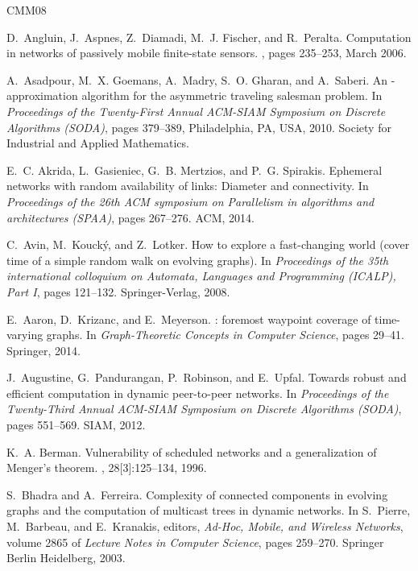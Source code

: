 \documentclass[oribibl, 11pt]{llncs}
\begin{document}
\newcommand{\etalchar}[1]{}
\begin{thebibliography}{CMM{\etalchar{+}}08}

\bibitem[AAD{\etalchar{+}}06]{AADFP06}
D.~Angluin, J.~Aspnes, Z.~Diamadi, M.~J. Fischer, and R.~Peralta.
\newblock Computation in networks of passively mobile finite-state sensors.
, pages 235--253, March 2006.

\bibitem[AGM{\etalchar{+}}10]{AGMGS10}
A.~Asadpour, M.~X. Goemans, A.~Madry, S.~O. Gharan, and A.~Saberi.
\newblock An {}-approximation algorithm for the
  asymmetric traveling salesman problem.
\newblock In {\em Proceedings of the Twenty-First Annual ACM-SIAM Symposium on
  Discrete Algorithms (SODA)}, pages 379--389, Philadelphia, PA, USA, 2010.
  Society for Industrial and Applied Mathematics.

E.~C. Akrida, L.~Gasieniec, G.~B. Mertzios, and P.~G. Spirakis.
\newblock Ephemeral networks with random availability of links: Diameter and
  connectivity.
\newblock In {\em Proceedings of the 26th ACM symposium on Parallelism in
  algorithms and architectures (SPAA)}, pages 267--276. ACM, 2014.

C.~Avin, M.~Kouck\'{y}, and Z.~Lotker.
\newblock How to explore a fast-changing world (cover time of a simple random
  walk on evolving graphs).
\newblock In {\em Proceedings of the 35th international colloquium on Automata,
  Languages and Programming (ICALP), Part I}, pages 121--132. Springer-Verlag,
  2008.

E.~Aaron, D.~Krizanc, and E.~Meyerson.
: foremost waypoint coverage of time-varying graphs.
\newblock In {\em Graph-Theoretic Concepts in Computer Science}, pages 29--41.
  Springer, 2014.

J.~Augustine, G.~Pandurangan, P.~Robinson, and E.~Upfal.
\newblock Towards robust and efficient computation in dynamic peer-to-peer
  networks.
\newblock In {\em Proceedings of the Twenty-Third Annual ACM-SIAM Symposium on
  Discrete Algorithms (SODA)}, pages 551--569. SIAM, 2012.

K.~A. Berman.
\newblock Vulnerability of scheduled networks and a generalization of
  {M}enger's theorem.
, 28[3]:125--134, 1996.

S.~Bhadra and A.~Ferreira.
\newblock Complexity of connected components in evolving graphs and the
  computation of multicast trees in dynamic networks.
\newblock In S.~Pierre, M.~Barbeau, and E.~Kranakis, editors, {\em Ad-Hoc,
  Mobile, and Wireless Networks}, volume 2865 of {\em Lecture Notes in Computer
  Science}, pages 259--270. Springer Berlin Heidelberg, 2003.


\end{thebibliography}
\end{document}
